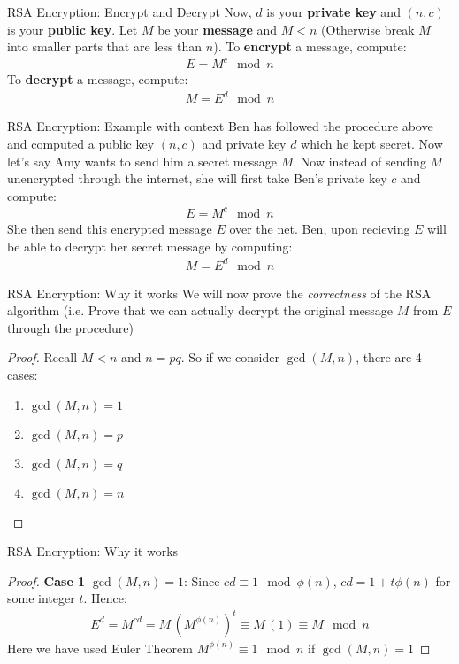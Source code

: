 \documentclass[10pt,xcolor={table,dvipsnames},t]{beamer}
\begin{document}
\begin{frame}{RSA Encryption: Encrypt and Decrypt}
    Now, $d$ is your \textbf{private key} and $(n,c)$ is your \textbf{public key}. Let $M$ be your \textbf{message} and $M<n$ (Otherwise break $M$ into smaller parts that are less than $n$). To \textbf{encrypt} a message, compute:
    \begin{align*}
      E = M^c \mod n
    \end{align*}
    To \textbf{decrypt} a message, compute:
    \begin{align*}
      M = E^d \mod n
    \end{align*}
\end{frame}

\begin{frame}{RSA Encryption: Example with context}
  Ben has followed the procedure above and computed a public key $(n,c)$ and private key $d$ which he kept secret. Now let's say Amy wants to send him a secret message $M$. Now instead of sending $M$ unencrypted through the internet, she will first take Ben's private key $c$ and compute:
  \begin{align*}
    E = M^c \mod n
  \end{align*}
  She then send this encrypted message $E$ over the net. Ben, upon recieving $E$ will be able to decrypt her secret message by computing:
  \begin{align*}
    M = E^d \mod n
  \end{align*}
\end{frame}

\begin{frame}{RSA Encryption: Why it works}
  We will now prove the \textit{correctness} of the RSA algorithm (i.e. Prove that we can actually decrypt the original message $M$ from $E$ through the procedure)

  \begin{proof} Recall $M < n$ and $n=pq$. So if we consider $\gcd(M,n)$, there are 4 cases:
    \begin{enumerate}
      \item $\gcd(M,n)=1$
      \item $\gcd(M,n)=p$
      \item $\gcd(M,n)=q$
      \item $\gcd(M,n)=n$
    \end{enumerate}
    \phantom\qedhere
  \end{proof}
\end{frame}

\begin{frame}{RSA Encryption: Why it works}
  \begin{proof} \textbf{Case 1} $\gcd(M,n)=1$: Since $cd\equiv 1 \mod \phi(n)$, $cd = 1 + t\phi(n)$ for some integer $t$. Hence:
    \begin{align*}
      E^{d} = M^{cd} = M \,\left(M^{\phi(n)}\right)^t \equiv M \,(1) \equiv M \mod n
    \end{align*}
    Here we have used Euler Theorem $M^{\phi(n)}\equiv 1 \mod n$ if $\gcd(M,n)=1$
    \phantom\qedhere
  \end{proof}
\end{frame}
\end{document}
